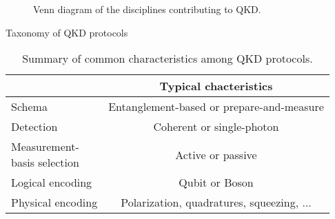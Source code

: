 \documentclass[aspectratio=169]{beamer}
\begin{document}
	\begin{frame}
		\begin{figure}
			\caption{Venn diagram of the disciplines contributing to QKD.}
		\end{figure}
	\end{frame}
	
	\begin{frame}{Taxonomy of QKD protocols}
		\begin{table}
			\caption{Summary of common characteristics among QKD protocols.}
			\begin{tabular}{lc}
				\toprule
				& Typical chacteristics \\
				\midrule
				Schema & Entanglement-based or prepare-and-measure \\
				Detection & Coherent or single-photon \\
				\makecell[l]{Measurement-\\basis selection} & Active or passive \\
				Logical encoding & Qubit or Boson \\
				Physical encoding & Polarization, quadratures, squeezing, ... \\
				\bottomrule
			\end{tabular}
		\end{table}
	\end{frame}
	
\end{document}
